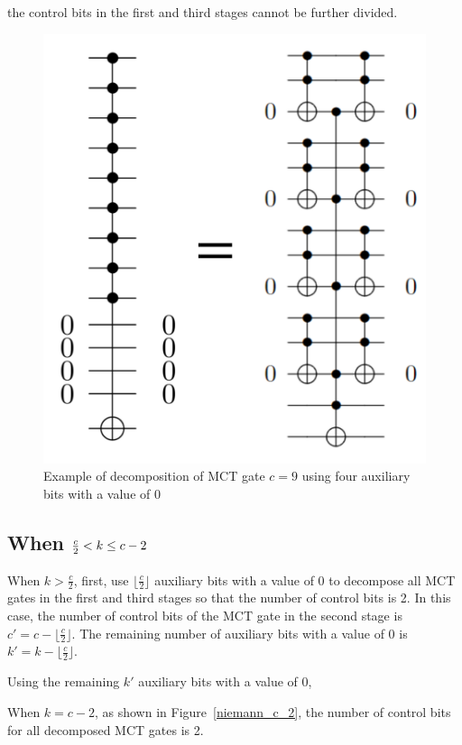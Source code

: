 the control bits in the first and third stages cannot be further divided.
\begin{figure}[tbp]
\centering
\includegraphics[width=0.95\linewidth]{img/niemann_k_frac_c_2.pdf}
\caption{Example of decomposition of MCT gate $c=9$ using four auxiliary bits with a value of 0}
\label{niemann_frac_c_2}
\end{figure}
\subsection*{When $\frac{c}{2} < k \leq c-2$}
When $k>\frac{c}{2}$,
first, use $\lfloor\frac{c}{2}\rfloor$ auxiliary bits with a value of 0 to decompose all MCT gates in the first and third stages so that the number of control bits is 2.
In this case, the number of control bits of the MCT gate in the second stage is $c'=c-\lfloor \frac{c}{2}\rfloor$.
The remaining number of auxiliary bits with a value of 0 is $k'=k-\lfloor \frac{c}{2} \rfloor$.

Using the remaining $k'$ auxiliary bits with a value of 0,
\par
When $k=c-2$,
as shown in Figure~\ref{niemann_c_2},
the number of control bits for all decomposed MCT gates is 2.

